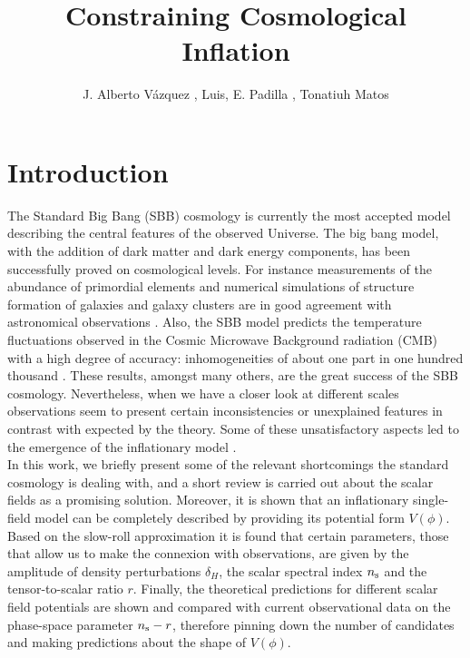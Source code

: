 \documentclass{rmaa}
\title{Constraining Cosmological Inflation}
\author{
J. Alberto V\'azquez \altaffilmark{1,2}, Luis, E. Padilla \altaffilmark{2}, Tonatiuh Matos \altaffilmark{2}}
\begin{document}

  \maketitle
\vspace{1em}
\section{Introduction}

The Standard Big Bang (SBB) cosmology is currently the most accepted model describing 
the central features of the observed Universe. The big bang model, with the addition 
of dark matter and dark energy components, has been successfully proved on 
cosmological levels. For instance measurements of 
 the abundance of primordial elements and numerical simulations of structure formation of galaxies
and galaxy clusters  are in good agreement with astronomical observations \citep{Kolbbo, Teg, Sping}. 
Also, the SBB model predicts the temperature fluctuations observed in the Cosmic 
Microwave Background radiation (CMB) with a high degree of accuracy: 
inhomogeneities of about one part in one hundred thousand \citep{Komat,Planckxvi} .
 These results, amongst many others, are the great success of 
the SBB cosmology. Nevertheless, 
when we have a closer look at different scales observations seem to present certain 
inconsistencies or unexplained features in contrast  with expected by 
the theory. Some of these unsatisfactory aspects led to the 
emergence of the inflationary model \citep{Guth, Linde, Linde2, Steinhardt}.
\\

In this work, we briefly present some of the relevant shortcomings the standard 
cosmology is dealing with, and a short review is carried out about the scalar fields as  a
promising solution. Moreover, it is shown that an inflationary single-field model can be 
completely described by providing its potential form $V(\phi)$. 
Based on the slow-roll approximation it is found that certain parameters, 
those that allow us to make the connexion with observations, are given by 
the amplitude of density perturbations $\delta_H$, the scalar spectral index $n_{\rm s}$
and the tensor-to-scalar ratio $r$.
Finally, the theoretical predictions for different scalar field potentials are shown and 
compared with current observational data on the phase-space parameter $n_{\rm s}-r$, 
therefore pinning down the number of candidates and making predictions about the shape of $V(\phi)$. 
\vspace{1em}
\end{document}
